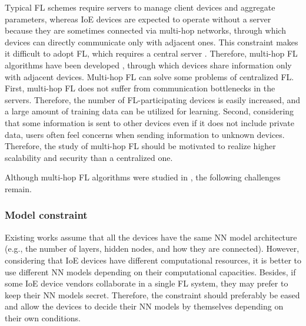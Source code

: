 \documentclass[journal]{IEEEtran}
\begin{document}
Typical \gls{FL} schemes require servers to manage client devices and aggregate parameters,
whereas \gls{IoE} devices are expected to operate without a server because they are sometimes connected via multi-hop networks,
through which devices can directly communicate only with adjacent ones.
This constraint makes it difficult to adopt \gls{FL}, which requires a central server \cite{savazzi2020federated}.
Therefore, multi-hop \gls{FL} algorithms have been developed \cite{lalitha2019peer,savazzi2020federated,lian2017can,niwa2020edge,sato2020network},
through which devices share information only with adjacent devices.
Multi-hop \gls{FL} can solve some problems of centralized \gls{FL}.
First, multi-hop \gls{FL} does not suffer from communication bottlenecks in the servers.
Therefore, the number of \gls{FL}-participating devices is easily increased,
and a large amount of training data can be utilized for learning.
Second, considering that some information is sent to other devices even if it does not include private data,
users often feel concerns when sending information to unknown devices.
Therefore, the study of multi-hop \gls{FL} should be motivated to realize higher scalability and security than a centralized one.

Although multi-hop \gls{FL} algorithms were studied in \cite{lalitha2019peer,savazzi2020federated,lian2017can,niwa2020edge,sato2020network},
the following challenges remain.

\subsubsection*{Model constraint}
Existing works assume that all the devices have the same \gls{NN} model architecture
(e.g., the number of layers, hidden nodes, and how they are connected).
However, considering that \gls{IoE} devices have different computational resources,
it is better to use different \gls{NN} models depending on their computational capacities.
Besides, if some \gls{IoE} device vendors collaborate in a single \gls{FL} system,
they may prefer to keep their \gls{NN} models secret.
Therefore, the constraint should preferably be eased
and allow the devices to decide their \gls{NN} models by themselves depending on their own conditions.
\end{document}
